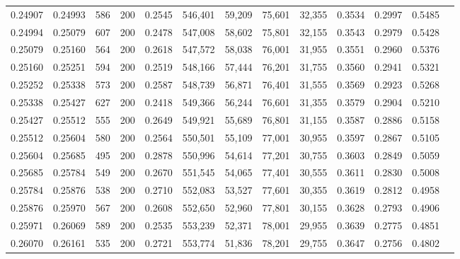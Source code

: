 \begin{tabular}{rrrrrrrrrrrrr}
0.24907 & 0.24993 &   586 & 200 &                                     0.2545 & 546,401 &  59,209 &  75,601 &  32,355 & 0.3534 & 0.2997 & 0.5485 \\
0.24994 & 0.25079 &   607 & 200 &                                     0.2478 & 547,008 &  58,602 &  75,801 &  32,155 & 0.3543 & 0.2979 & 0.5428 \\
0.25079 & 0.25160 &   564 & 200 &                                     0.2618 & 547,572 &  58,038 &  76,001 &  31,955 & 0.3551 & 0.2960 & 0.5376 \\
0.25160 & 0.25251 &   594 & 200 &                                     0.2519 & 548,166 &  57,444 &  76,201 &  31,755 & 0.3560 & 0.2941 & 0.5321 \\
0.25252 & 0.25338 &   573 & 200 &                                     0.2587 & 548,739 &  56,871 &  76,401 &  31,555 & 0.3569 & 0.2923 & 0.5268 \\
0.25338 & 0.25427 &   627 & 200 &                                     0.2418 & 549,366 &  56,244 &  76,601 &  31,355 & 0.3579 & 0.2904 & 0.5210 \\
0.25427 & 0.25512 &   555 & 200 &                                     0.2649 & 549,921 &  55,689 &  76,801 &  31,155 & 0.3587 & 0.2886 & 0.5158 \\
0.25512 & 0.25604 &   580 & 200 &                                     0.2564 & 550,501 &  55,109 &  77,001 &  30,955 & 0.3597 & 0.2867 & 0.5105 \\
0.25604 & 0.25685 &   495 & 200 &                                     0.2878 & 550,996 &  54,614 &  77,201 &  30,755 & 0.3603 & 0.2849 & 0.5059 \\
0.25685 & 0.25784 &   549 & 200 &                                     0.2670 & 551,545 &  54,065 &  77,401 &  30,555 & 0.3611 & 0.2830 & 0.5008 \\
0.25784 & 0.25876 &   538 & 200 &                                     0.2710 & 552,083 &  53,527 &  77,601 &  30,355 & 0.3619 & 0.2812 & 0.4958 \\
0.25876 & 0.25970 &   567 & 200 &                                     0.2608 & 552,650 &  52,960 &  77,801 &  30,155 & 0.3628 & 0.2793 & 0.4906 \\
0.25971 & 0.26069 &   589 & 200 &                                     0.2535 & 553,239 &  52,371 &  78,001 &  29,955 & 0.3639 & 0.2775 & 0.4851 \\
0.26070 & 0.26161 &   535 & 200 &                                     0.2721 & 553,774 &  51,836 &  78,201 &  29,755 & 0.3647 & 0.2756 & 0.4802 \\

\end{tabular}
